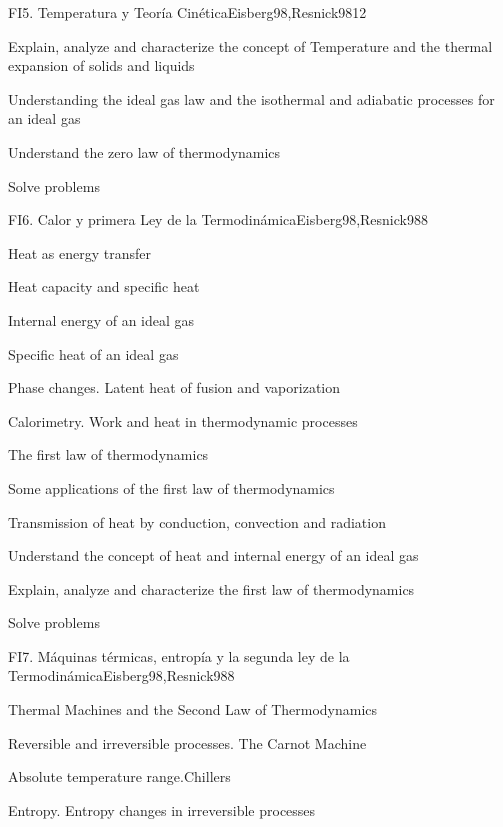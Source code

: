 \begin{syllabus}
\begin{unit}{FI5. Temperatura y Teoría Cinética}{Eisberg98,Resnick98}{12}
   \begin{unitgoals}
         \item  Explain, analyze and characterize the concept of Temperature and the thermal expansion of solids and liquids
         \item  Understanding the ideal gas law and the isothermal and adiabatic processes for an ideal gas
         \item  Understand the zero law of thermodynamics
         \item  Solve problems
   \end{unitgoals}
\end{unit}

\begin{unit}{FI6. Calor y primera Ley de la Termodinámica}{Eisberg98,Resnick98}{8}
\begin{topics}
         \item  Heat as energy transfer
	 \item  Heat capacity and specific heat
         \item  Internal energy of an ideal gas
	 \item  Specific heat of an ideal gas
         \item  Phase changes. Latent heat of fusion and vaporization
	 \item  Calorimetry. Work and heat in thermodynamic processes
         \item  The first law of thermodynamics
	 \item  Some applications of the first law of thermodynamics
         \item  Transmission of heat by conduction, convection and radiation
   \end{topics}

   \begin{unitgoals}
         \item  Understand the concept of heat and internal energy of an ideal gas
         \item  Explain, analyze and characterize the first law of thermodynamics
         \item  Solve problems
   \end{unitgoals}
\end{unit}

\begin{unit}{FI7. Máquinas térmicas, entropía y la segunda ley de la Termodinámica}{Eisberg98,Resnick98}{8}
\begin{topics}
         \item  Thermal Machines and the Second Law of Thermodynamics
	 \item  Reversible and irreversible processes. The Carnot Machine
         \item  Absolute temperature range.Chillers 
	 \item  Entropy. Entropy changes in irreversible processes
   \end{topics}


\end{unit}
\end{syllabus}
